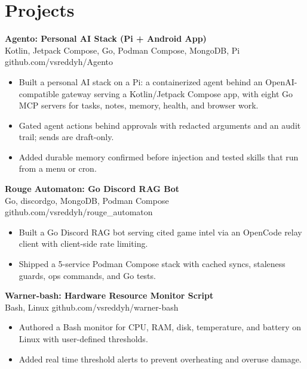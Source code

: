 \documentclass[a4paper,11pt]{article}
\newcommand{\resumeItem}[1]{\item \small{#1}}
\newcommand{\resumeSubheading}[4]{%
  \textbf{#1} \hfill \textbf{#2} \\
{#3} \hfill {#4}
}
\newcommand{\resumeSubHeadingListStart}{\begin{itemize}}
\newcommand{\resumeSubHeadingListEnd}{\end{itemize}}
\begin{document}
\section*{Projects}

\resumeSubheading
{Agento: Personal AI Stack (Pi + Android App)}{}{Kotlin, Jetpack Compose, Go, Podman Compose, MongoDB, Pi}{github.com/vsreddyh/Agento}
\resumeSubHeadingListStart
\resumeItem{Built a personal AI stack on a Pi: a containerized agent behind an OpenAI-compatible gateway serving a Kotlin/Jetpack Compose app, with eight Go MCP servers for tasks, notes, memory, health, and browser work.}
\resumeItem{Gated agent actions behind approvals with redacted arguments and an audit trail; sends are draft-only.}
\resumeItem{Added durable memory confirmed before injection and tested skills that run from a menu or cron.}
\resumeSubHeadingListEnd

\resumeSubheading
{Rouge Automaton: Go Discord RAG Bot}{}{Go, discordgo, MongoDB, Podman Compose}{github.com/vsreddyh/rouge\_automaton}
\resumeSubHeadingListStart
\resumeItem{Built a Go Discord RAG bot serving cited game intel via an OpenCode relay client with client-side rate limiting.}
\resumeItem{Shipped a 5-service Podman Compose stack with cached syncs, staleness guards, ops commands, and Go tests.}
\resumeSubHeadingListEnd

\resumeSubheading
{Warner-bash: Hardware Resource Monitor Script}{}{Bash, Linux}{github.com/vsreddyh/warner-bash}
\resumeSubHeadingListStart
\resumeItem{Authored a Bash monitor for CPU, RAM, disk, temperature, and battery on Linux with user-defined thresholds.}
\resumeItem{Added real time threshold alerts to prevent overheating and overuse damage.}
\resumeSubHeadingListEnd


\vspace{-0.6em}
\end{document}
